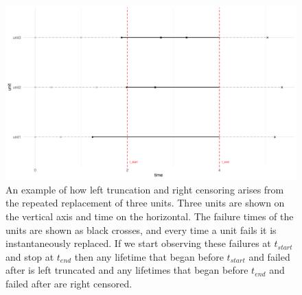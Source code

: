 \begin{figure}[h]
    \centering
    \includegraphics[width=1\textwidth]{./figures/left_truncation_w_right_censoring_example.pdf}
    \caption{An example of how left truncation and right censoring arises from the repeated replacement of three units. Three units are shown on the vertical axis and time on the horizontal. The failure times of the units are shown as black crosses, and every time a unit fails it is instantaneously replaced. If we start observing these failures at $t_{start}$ and stop at $t_{end}$ then any lifetime that began before $t_{start}$ and failed after is left truncated and any lifetimes that began before $t_{end}$ and failed after are right censored.}
    \label{fig:left_trunc_and_right_cens_example}
\end{figure}

